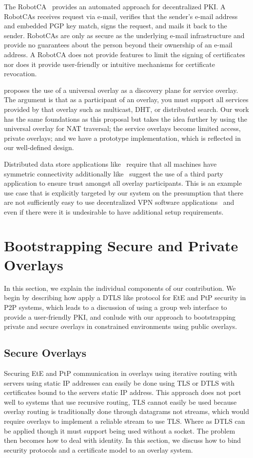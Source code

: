 \documentclass[conference]{IEEEtran}
\begin{document}
The RobotCA~\cite{robotca} provides an automated approach for decentralized
PKI.  A RobotCAs receives request via e-mail, verifies that the sender's e-mail
address and embedded PGP key match, signs the request, and mails it back to the
sender.  RobotCAs are only as secure as the underlying e-mail infrastructure
and provide no guarantees about the person beyond their ownership of an e-mail
address.  A RobotCA does not provide features to limit the signing of
certificates nor does it provide user-friendly or intuitive mechanisms for
certificate revocation.

\cite{one_ring} proposes the use of a universal overlay as a discovery plane for
service overlay.  The argument is that as a participant of an overlay, you
must support all services provided by that overlay such as multicast, DHT,
or distributed search.  Our work has the same foundations as this proposal but
takes the idea further by using the universal overlay for NAT traversal;
the service overlays become limited access, private overlays; and we have
a prototype implementation, which is reflected in our well-defined design.

Distributed data store applications like~\cite{dynamo, bigtable} require that
all machines have symmetric connectivity additionally like~\cite{past} suggest
the use of a third party application to ensure trust amongst all overlay
participants.  This is an example use case that is explicitly targeted by our
system on the presumption that there are not sufficiently easy to use
decentralized VPN software applications~\cite{nsdi10} and even if there
were it is undesirable to have additional setup requirements.

\section{Bootstrapping Secure and Private Overlays}
\label{contributions}
In this section, we explain the individual components of our contribution.  We
begin by describing how apply a DTLS like protocol for EtE and PtP security in
P2P systems, which leads to a discussion of using a group web interface to
provide a user-friendly PKI, and conlude with our approach to bootstrapping
private and secure overlays in constrained environments using public overlays.

\subsection{Secure Overlays}
\label{secure_overlays}
Securing EtE and PtP communication in overlays using iterative routing with
servers using static IP addresses can easily be done using TLS or DTLS with
certificates bound to the servers static IP address.  This approach does not
port well to systems that use recursive routing, TLS cannot easily be used
because overlay routing is traditionally done through datagrams not streams,
which would require overlays to implement a reliable stream to use TLS.  Where
as DTLS can be applied though it must support being used without a socket.  The
problem then becomes how to deal with identity.  In this section, we discuss how
to bind security protocols and a certificate model to an overlay system.
\end{document}
